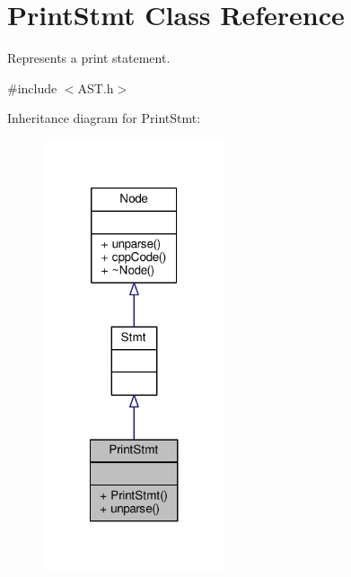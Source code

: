 \hypertarget{classPrintStmt}{\section{Print\-Stmt Class Reference}
\label{classPrintStmt}
}


Represents a print statement. \par
  




{\ttfamily \#include $<$A\-S\-T.\-h$>$}



Inheritance diagram for Print\-Stmt\-:\nopagebreak
\begin{figure}[H]
\begin{center}
\leavevmode
\includegraphics[width=152pt]{classPrintStmt__inherit__graph}
\end{center}
\end{figure}



